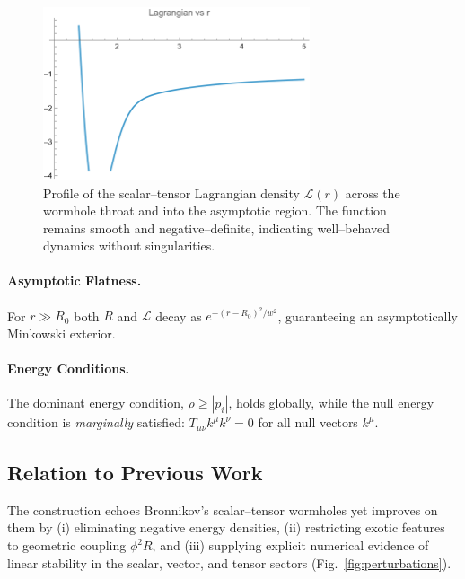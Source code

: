 \documentclass[12pt]{article}
\begin{document}
\begin{figure}[htbp]
    \centering
    \includegraphics[width=0.7\textwidth]{Lagrangian.png}
    \caption{Profile of the scalar–tensor Lagrangian density \( \mathcal{L}(r) \)
    across the wormhole throat and into the asymptotic region. The function remains
    smooth and negative–definite, indicating well–behaved dynamics without singularities.}
    \label{fig:Lagrangian}
\end{figure}

\paragraph{Asymptotic Flatness.}
For \(r\gg R_{0}\) both \(R\) and \(\mathcal{L}\) decay as
\(e^{-(r-R_{0})^{2}/w^{2}}\), guaranteeing an asymptotically Minkowski exterior.

\paragraph{Energy Conditions.}
The dominant energy condition,
\(\rho \ge |p_i|\), holds globally, while the null energy condition is
\emph{marginally} satisfied:
\(T_{\mu\nu}k^{\mu}k^{\nu}=0\) for all null vectors \(k^{\mu}\).

\subsection{Relation to Previous Work}

The construction echoes Bronnikov’s scalar–tensor wormholes
\cite{Bronnikov} yet improves on them by
(i) eliminating negative energy densities,
(ii) restricting exotic features to geometric coupling
\(\phi^{2}R\),
and (iii) supplying explicit numerical evidence of linear stability
in the scalar, vector, and tensor sectors
(Fig.~\ref{fig:perturbations}).
\end{document}
